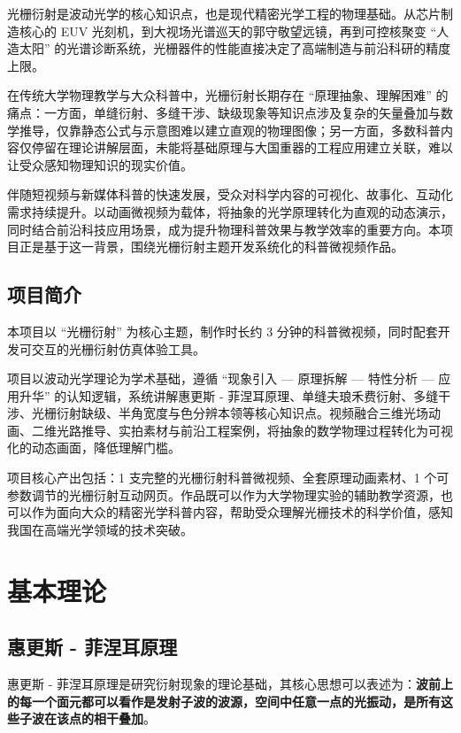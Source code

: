 \documentclass[12pt,a4paper]{ctexrep}
\begin{document}
光栅衍射是波动光学的核心知识点，也是现代精密光学工程的物理基础。从芯片制造核心的 EUV 光刻机，到大视场光谱巡天的郭守敬望远镜，再到可控核聚变 “人造太阳” 的光谱诊断系统，光栅器件的性能直接决定了高端制造与前沿科研的精度上限。

在传统大学物理教学与大众科普中，光栅衍射长期存在 “原理抽象、理解困难” 的痛点：一方面，单缝衍射、多缝干涉、缺级现象等知识点涉及复杂的矢量叠加与数学推导，仅靠静态公式与示意图难以建立直观的物理图像；另一方面，多数科普内容仅停留在理论讲解层面，未能将基础原理与大国重器的工程应用建立关联，难以让受众感知物理知识的现实价值。

伴随短视频与新媒体科普的快速发展，受众对科学内容的可视化、故事化、互动化需求持续提升。以动画微视频为载体，将抽象的光学原理转化为直观的动态演示，同时结合前沿科技应用场景，成为提升物理科普效果与教学效率的重要方向。本项目正是基于这一背景，围绕光栅衍射主题开发系统化的科普微视频作品。

\subsection{项目简介}

本项目以 “光栅衍射” 为核心主题，制作时长约 3 分钟的科普微视频，同时配套开发可交互的光栅衍射仿真体验工具。

项目以波动光学理论为学术基础，遵循 “现象引入 — 原理拆解 — 特性分析 — 应用升华” 的认知逻辑，系统讲解惠更斯 - 菲涅耳原理、单缝夫琅禾费衍射、多缝干涉、光栅衍射缺级、半角宽度与色分辨本领等核心知识点。视频融合三维光场动画、二维光路推导、实拍素材与前沿工程案例，将抽象的数学物理过程转化为可视化的动态画面，降低理解门槛。

项目核心产出包括：1 支完整的光栅衍射科普微视频、全套原理动画素材、1 个可参数调节的光栅衍射互动网页。作品既可以作为大学物理实验的辅助教学资源，也可以作为面向大众的精密光学科普内容，帮助受众理解光栅技术的科学价值，感知我国在高端光学领域的技术突破。

\section{基本理论}

\subsection{惠更斯 - 菲涅耳原理}

惠更斯 - 菲涅耳原理是研究衍射现象的理论基础，其核心思想可以表述为：\textbf{波前上的每一个面元都可以看作是发射子波的波源，空间中任意一点的光振动，是所有这些子波在该点的相干叠加}。
\end{document}
